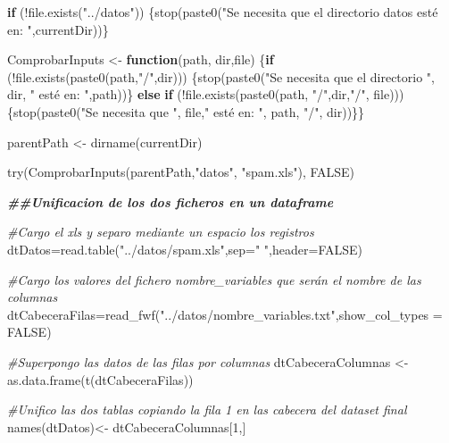 \documentclass[
]{article}
\newenvironment{Shaded}{\begin{snugshade}}{\end{snugshade}}
\newcommand{\AttributeTok}[1]{\textcolor[rgb]{0.77,0.63,0.00}{#1}}
\newcommand{\CommentTok}[1]{\textcolor[rgb]{0.56,0.35,0.01}{\textit{#1}}}
\newcommand{\ConstantTok}[1]{\textcolor[rgb]{0.00,0.00,0.00}{#1}}
\newcommand{\ControlFlowTok}[1]{\textcolor[rgb]{0.13,0.29,0.53}{\textbf{#1}}}
\newcommand{\DecValTok}[1]{\textcolor[rgb]{0.00,0.00,0.81}{#1}}
\newcommand{\DocumentationTok}[1]{\textcolor[rgb]{0.56,0.35,0.01}{\textbf{\textit{#1}}}}
\newcommand{\FunctionTok}[1]{\textcolor[rgb]{0.00,0.00,0.00}{#1}}
\newcommand{\NormalTok}[1]{#1}
\newcommand{\OtherTok}[1]{\textcolor[rgb]{0.56,0.35,0.01}{#1}}
\newcommand{\SpecialCharTok}[1]{\textcolor[rgb]{0.00,0.00,0.00}{#1}}
\newcommand{\StringTok}[1]{\textcolor[rgb]{0.31,0.60,0.02}{#1}}
\begin{document}
\begin{Shaded}
\begin{Highlighting}[]
\ControlFlowTok{if}\NormalTok{ (}\SpecialCharTok{!}\FunctionTok{file.exists}\NormalTok{(}\StringTok{"../datos"}\NormalTok{)) }
\NormalTok{\{}\FunctionTok{stop}\NormalTok{(}\FunctionTok{paste0}\NormalTok{(}\StringTok{"Se necesita que el directorio datos esté en: "}\NormalTok{,currentDir))\} }


\NormalTok{ComprobarInputs }\OtherTok{\textless{}{-}} \ControlFlowTok{function}\NormalTok{(path, dir,file)}
\NormalTok{\{}\ControlFlowTok{if}\NormalTok{ (}\SpecialCharTok{!}\FunctionTok{file.exists}\NormalTok{(}\FunctionTok{paste0}\NormalTok{(path,}\StringTok{"/"}\NormalTok{,dir)))}
\NormalTok{\{}\FunctionTok{stop}\NormalTok{(}\FunctionTok{paste0}\NormalTok{(}\StringTok{"Se necesita que el directorio "}\NormalTok{, dir, }\StringTok{" esté en: "}\NormalTok{,path))\}}
  \ControlFlowTok{else} \ControlFlowTok{if}\NormalTok{ (}\SpecialCharTok{!}\FunctionTok{file.exists}\NormalTok{(}\FunctionTok{paste0}\NormalTok{(path, }\StringTok{"/"}\NormalTok{,dir,}\StringTok{"/"}\NormalTok{, file)))}
\NormalTok{    \{}\FunctionTok{stop}\NormalTok{(}\FunctionTok{paste0}\NormalTok{(}\StringTok{"Se necesita que "}\NormalTok{, file,}\StringTok{" esté en: "}\NormalTok{, path, }\StringTok{"/"}\NormalTok{, dir))\}\}}

\NormalTok{parentPath }\OtherTok{\textless{}{-}} \FunctionTok{dirname}\NormalTok{(currentDir)}

\FunctionTok{try}\NormalTok{(}\FunctionTok{ComprobarInputs}\NormalTok{(parentPath,}\StringTok{"datos"}\NormalTok{, }\StringTok{"spam.xls"}\NormalTok{), }\ConstantTok{FALSE}\NormalTok{)}

\DocumentationTok{\#\#Unificacion de los dos ficheros en un dataframe}

\CommentTok{\#Cargo el xls y separo mediante un espacio los registros}
\NormalTok{dtDatos}\OtherTok{=}\FunctionTok{read.table}\NormalTok{(}\StringTok{"../datos/spam.xls"}\NormalTok{,}\AttributeTok{sep=}\StringTok{" "}\NormalTok{,}\AttributeTok{header=}\ConstantTok{FALSE}\NormalTok{)}

\CommentTok{\#Cargo los valores del fichero nombre\_variables que serán el nombre de las columnas}
\NormalTok{dtCabeceraFilas}\OtherTok{=}\FunctionTok{read\_fwf}\NormalTok{(}\StringTok{"../datos/nombre\_variables.txt"}\NormalTok{,}\AttributeTok{show\_col\_types =} \ConstantTok{FALSE}\NormalTok{)}
 
\CommentTok{\#Superpongo las datos de las filas por columnas}
\NormalTok{dtCabeceraColumnas }\OtherTok{\textless{}{-}} \FunctionTok{as.data.frame}\NormalTok{(}\FunctionTok{t}\NormalTok{(dtCabeceraFilas))}

\CommentTok{\#Unifico las dos tablas copiando la fila 1 en las cabecera del dataset final}
\FunctionTok{names}\NormalTok{(dtDatos)}\OtherTok{\textless{}{-}}\NormalTok{ dtCabeceraColumnas[}\DecValTok{1}\NormalTok{,]}
\end{Highlighting}
\end{Shaded}
\end{document}
